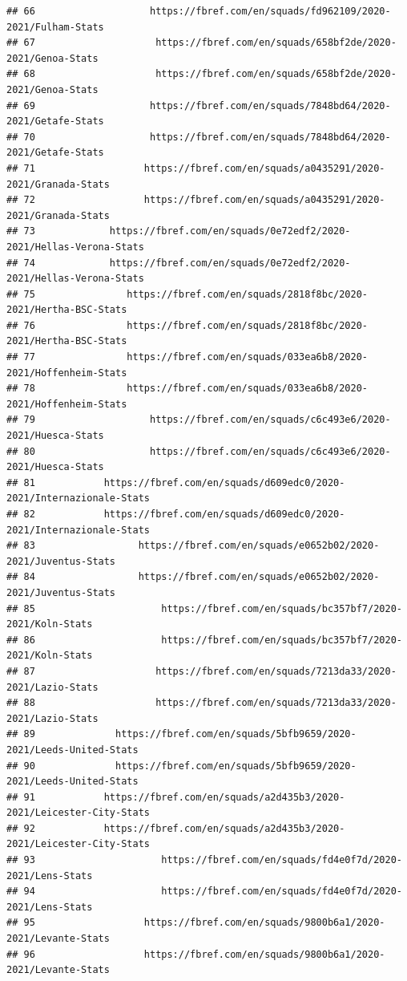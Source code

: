 \documentclass[
]{book}
\theoremstyle{definition}
\theoremstyle{definition}
\theoremstyle{definition}
\theoremstyle{definition}
\theoremstyle{remark}
\begin{document}
\begin{verbatim}
## 66                    https://fbref.com/en/squads/fd962109/2020-2021/Fulham-Stats
## 67                     https://fbref.com/en/squads/658bf2de/2020-2021/Genoa-Stats
## 68                     https://fbref.com/en/squads/658bf2de/2020-2021/Genoa-Stats
## 69                    https://fbref.com/en/squads/7848bd64/2020-2021/Getafe-Stats
## 70                    https://fbref.com/en/squads/7848bd64/2020-2021/Getafe-Stats
## 71                   https://fbref.com/en/squads/a0435291/2020-2021/Granada-Stats
## 72                   https://fbref.com/en/squads/a0435291/2020-2021/Granada-Stats
## 73             https://fbref.com/en/squads/0e72edf2/2020-2021/Hellas-Verona-Stats
## 74             https://fbref.com/en/squads/0e72edf2/2020-2021/Hellas-Verona-Stats
## 75                https://fbref.com/en/squads/2818f8bc/2020-2021/Hertha-BSC-Stats
## 76                https://fbref.com/en/squads/2818f8bc/2020-2021/Hertha-BSC-Stats
## 77                https://fbref.com/en/squads/033ea6b8/2020-2021/Hoffenheim-Stats
## 78                https://fbref.com/en/squads/033ea6b8/2020-2021/Hoffenheim-Stats
## 79                    https://fbref.com/en/squads/c6c493e6/2020-2021/Huesca-Stats
## 80                    https://fbref.com/en/squads/c6c493e6/2020-2021/Huesca-Stats
## 81            https://fbref.com/en/squads/d609edc0/2020-2021/Internazionale-Stats
## 82            https://fbref.com/en/squads/d609edc0/2020-2021/Internazionale-Stats
## 83                  https://fbref.com/en/squads/e0652b02/2020-2021/Juventus-Stats
## 84                  https://fbref.com/en/squads/e0652b02/2020-2021/Juventus-Stats
## 85                      https://fbref.com/en/squads/bc357bf7/2020-2021/Koln-Stats
## 86                      https://fbref.com/en/squads/bc357bf7/2020-2021/Koln-Stats
## 87                     https://fbref.com/en/squads/7213da33/2020-2021/Lazio-Stats
## 88                     https://fbref.com/en/squads/7213da33/2020-2021/Lazio-Stats
## 89              https://fbref.com/en/squads/5bfb9659/2020-2021/Leeds-United-Stats
## 90              https://fbref.com/en/squads/5bfb9659/2020-2021/Leeds-United-Stats
## 91            https://fbref.com/en/squads/a2d435b3/2020-2021/Leicester-City-Stats
## 92            https://fbref.com/en/squads/a2d435b3/2020-2021/Leicester-City-Stats
## 93                      https://fbref.com/en/squads/fd4e0f7d/2020-2021/Lens-Stats
## 94                      https://fbref.com/en/squads/fd4e0f7d/2020-2021/Lens-Stats
## 95                   https://fbref.com/en/squads/9800b6a1/2020-2021/Levante-Stats
## 96                   https://fbref.com/en/squads/9800b6a1/2020-2021/Levante-Stats

\end{verbatim}
\end{document}
